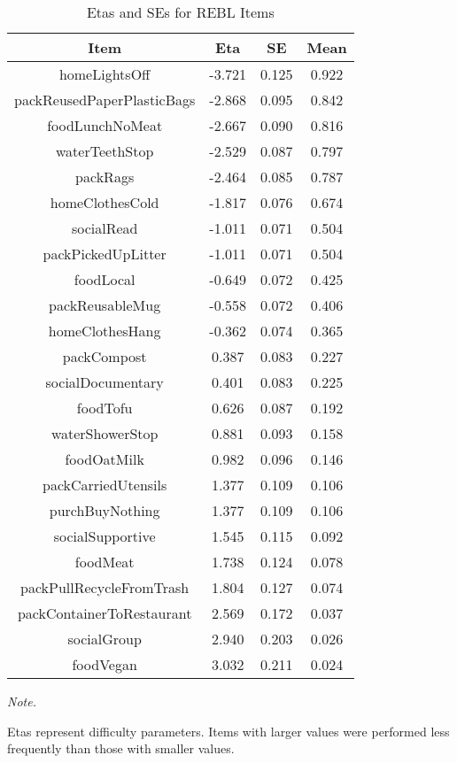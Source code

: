 \begin{table}[!h]
\centering
\caption{\label{tab:etas}Etas and SEs for REBL Items}
\centering
\fontsize{10}{12}\selectfont
\begin{threeparttable}
\begin{tabular}[t]{cccc}
\hline\hline
Item & Eta & SE & Mean\\
\midrule
homeLightsOff & -3.721 & 0.125 & 0.922\\
packReusedPaperPlasticBags & -2.868 & 0.095 & 0.842\\
foodLunchNoMeat & -2.667 & 0.090 & 0.816\\
waterTeethStop & -2.529 & 0.087 & 0.797\\
packRags & -2.464 & 0.085 & 0.787\\
homeClothesCold & -1.817 & 0.076 & 0.674\\
socialRead & -1.011 & 0.071 & 0.504\\
packPickedUpLitter & -1.011 & 0.071 & 0.504\\
foodLocal & -0.649 & 0.072 & 0.425\\
packReusableMug & -0.558 & 0.072 & 0.406\\
homeClothesHang & -0.362 & 0.074 & 0.365\\
packCompost & 0.387 & 0.083 & 0.227\\
socialDocumentary & 0.401 & 0.083 & 0.225\\
foodTofu & 0.626 & 0.087 & 0.192\\
waterShowerStop & 0.881 & 0.093 & 0.158\\
foodOatMilk & 0.982 & 0.096 & 0.146\\
packCarriedUtensils & 1.377 & 0.109 & 0.106\\
purchBuyNothing & 1.377 & 0.109 & 0.106\\
socialSupportive & 1.545 & 0.115 & 0.092\\
foodMeat & 1.738 & 0.124 & 0.078\\
packPullRecycleFromTrash & 1.804 & 0.127 & 0.074\\
packContainerToRestaurant & 2.569 & 0.172 & 0.037\\
socialGroup & 2.940 & 0.203 & 0.026\\
foodVegan & 3.032 & 0.211 & 0.024\\
\hline\hline
\end{tabular}
\begin{tablenotes}[para]
\item \textit{Note. } 
\item Etas represent difficulty parameters. Items with larger values were performed less frequently than those with smaller values.
\end{tablenotes}
\end{threeparttable}
\end{table}
